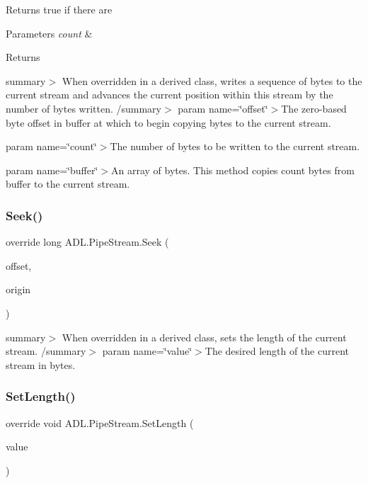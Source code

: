 Returns true if there are 


\begin{DoxyParams}{Parameters}
{\em count} & \\
\hline
\end{DoxyParams}
\begin{DoxyReturn}{Returns}

\end{DoxyReturn}
summary$>$ When overridden in a derived class, writes a sequence of bytes to the current stream and advances the current position within this stream by the number of bytes written. /summary$>$ param name=\char`\"{}offset\char`\"{}$>$The zero-\/based byte offset in buffer at which to begin copying bytes to the current stream. 

param name=\char`\"{}count\char`\"{}$>$The number of bytes to be written to the current stream. 

param name=\char`\"{}buffer\char`\"{}$>$An array of bytes. This method copies count bytes from buffer to the current stream. \mbox{\label{class_a_d_l_1_1_pipe_stream_ae34adb2842a65053e2e13dcb15fe65e5}} 
\subsubsection{\texorpdfstring{Seek()}{Seek()}}
{\footnotesize\ttfamily override long A\+D\+L.\+Pipe\+Stream.\+Seek (\begin{DoxyParamCaption}\item[{long}]{offset,  }\item[{Seek\+Origin}]{origin }\end{DoxyParamCaption})}

summary$>$ When overridden in a derived class, sets the length of the current stream. /summary$>$ param name=\char`\"{}value\char`\"{}$>$The desired length of the current stream in bytes. \mbox{\label{class_a_d_l_1_1_pipe_stream_a66a10533676de87061ae89c0ab2c62c5}} 
\subsubsection{\texorpdfstring{Set\+Length()}{SetLength()}}
{\footnotesize\ttfamily override void A\+D\+L.\+Pipe\+Stream.\+Set\+Length (\begin{DoxyParamCaption}\item[{long}]{value }\end{DoxyParamCaption})}

